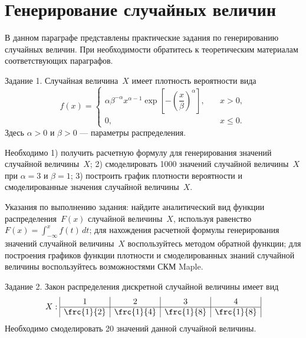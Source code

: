 \section{Генерирование случайных величин}

В данном параграфе представлены практические задания по генерированию случайных величин. При необходимости обратитесь к теоретическим  материалам соответствующих параграфов.

Задание 1. Случайная величина~$X$ имеет плотность вероятности вида
 $$
 f(x)=\left\{
 \begin{array}{ll}
 \alpha \beta^{-\alpha}x^{\alpha-1}\exp\left[-\left(
 \dfrac{x}{\beta}\right)^{\alpha}\right], & \quad x > 0,\\
 0, & \quad x \leqslant 0.
 \end{array}
 \right.
 $$
Здесь $\alpha >0$ и $\beta >0$ --- параметры распределения. 
 
Необходимо 1) получить расчетную формулу для генерирования значений случайной величины~$X$; 2) смоделировать 1000 значений случайной величины~$X$ при $\alpha=3$ и $\beta=1$; 3) построить график плотности вероятности и смоделированные значения случайной величины~$X$.       

Указания по выполнению задания: найдите аналитический вид функции распределения~$F(x)$ случайной величины~$X$, используя равенство  $F(x)=\int_{-\infty}^xf(t)\,dt$; для нахождения расчетной формулы генерирования значений случайной величины~$X$ воспользуйтесь методом обратной функции; для построения графиков функции плотности и смоделированных знаний случайной величины воспользуйтесь возможностями СКМ Maple.    

Задание 2. Закон распределения дискретной случайной величины имеет вид
$$
X:
\begin{array}{|c|c|c|c|}
1 & 2 & 3 & 4 \\
\hline \frc{1}{2} & \frc{1}{4} & \frc{1}{8} & \frc{1}{8}
\end{array}
$$
Необходимо смоделировать 20 значений данной случайной величины.
 
